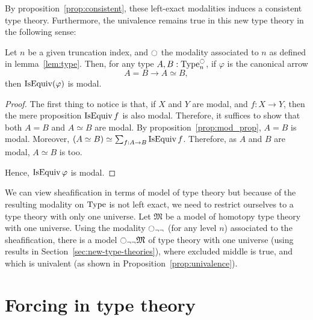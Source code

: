 By proposition~\ref{prop:consistent}, these left-exact modalities
induces a consistent type theory. Furthermore, the univalence remains
true in this new type theory in the following sense:
\begin{prop}\label{prop:univalence}
  Let $n$ be a given truncation index, and $\ocircle$ the modality
  associated to $n$ as defined in lemma~\ref{lem:type}. Then, for
  any type $A,B:\operatorname{Type}_n^{\ocircle}$, if $\varphi$ is the canonical arrow
  $$A = B \to A\simeq B,$$
  then $\operatorname{IsEquiv}(\varphi)$ is modal.
\end{prop}
\begin{proof}
  The first thing to notice is that, if $X$ and $Y$ are modal, and
  $f:X \to Y$, then the mere proposition $\operatorname{IsEquiv} f$ is also modal.
  Therefore, it suffices to show that both $A=B$ and $A\simeq B$ are
  modal. By proposition~\ref{prop:mod_prop}, $A=B$ is modal. 
  Moreover, $(A\simeq B) \simeq \sum_{f:A\to B} \operatorname{IsEquiv}
  f$. Therefore, as $A$ and $B$ are modal, $A\simeq B$ is too. 

  Hence, $\operatorname{IsEquiv} \varphi$ is modal.
\end{proof}

We can view sheafification in terms of model of type theory but
because of the resulting modality on $\operatorname{Type}$ is not left exact, we
need to restrict ourselves to a type theory with only one universe.
%
Let $\mathfrak M$ be a model of homotopy type theory with one
universe.
%
Using the modality $\ocircle_{\lnot \lnot}$ (for any level $n$) associated to the
sheafification, there is a model $\ocircle_{\lnot \lnot} \mathfrak M$ of type theory
with one universe (using results in
Section~\ref{sec:new-type-theories}), where excluded middle is true, and
which is univalent (as shown in Proposition~\ref{prop:univalence}).
%



\section{Forcing in type theory}
\label{sec:forcing}
